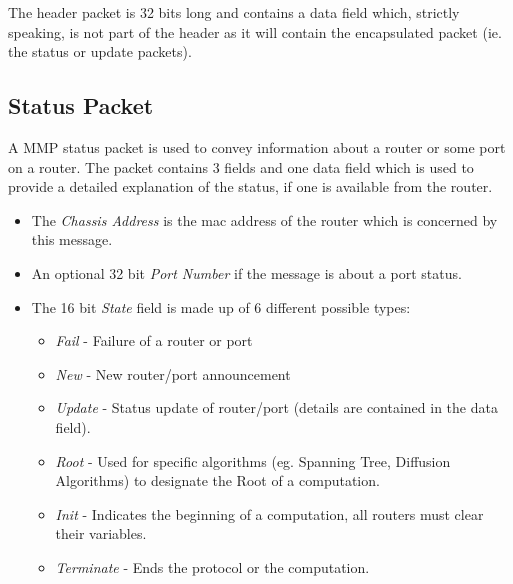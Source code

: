 
The header packet is 32 bits long and contains a data field which, strictly
speaking, is not part of the header as it will contain the encapsulated packet (ie. the status or update packets). 


% 

\subsection{Status Packet}

A MMP status packet is used to convey information about a router or some port
on a router.  The packet contains 3 fields and one data field which is used to
provide a detailed explanation of the status, if one is available from the
router.

\begin{itemize}
 \item The \textit{Chassis Address} is the mac address of the router which
is concerned by this message. 
 \item An optional 32 bit \textit{Port Number} if the message is about a port
status.
 \item The 16 bit \textit{State} field is made up of 6 different possible
types:
      \begin{itemize}
	    \item \textit{Fail} - Failure of a router or port
	    \item \textit{New} - New router/port announcement
	    \item \textit{Update} - Status update of router/port (details are
contained in the data field).
	    \item \textit{Root} - Used for specific algorithms (eg. Spanning
Tree, Diffusion Algorithms) to designate the Root of a computation.
	    \item \textit{Init} - Indicates the beginning of a computation, all
routers must clear their variables.
	    \item \textit{Terminate} - Ends the protocol or the computation.
      \end{itemize}
\end{itemize}



